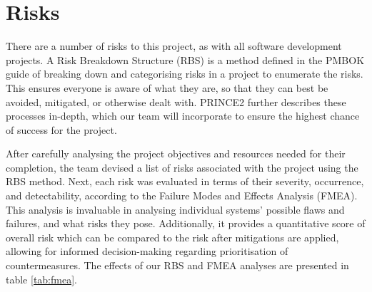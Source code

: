 \chapter{Risks}
There are a number of risks to this project, as with all software development projects. A Risk Breakdown Structure (RBS) is a method defined in the PMBOK guide \cite{pmbok2013} of breaking down and categorising risks in a project to enumerate the risks. This ensures everyone is aware of what they are, so that they can best be avoided, mitigated, or otherwise dealt with. PRINCE2 \cite{prince2} further describes these processes in-depth, which our team will incorporate to ensure the highest chance of success for the project.



After carefully analysing the project objectives and resources needed for their completion, the team devised a list of risks associated with the project using the RBS method. Next, each risk was evaluated in terms of their severity, occurrence, and detectability, according to the Failure Modes and Effects Analysis (FMEA). This analysis is invaluable in analysing individual systems' possible flaws and failures, and what risks they pose. Additionally, it provides a quantitative score of overall risk which can be compared to the risk after mitigations are applied, allowing for informed decision-making regarding prioritisation of countermeasures. The effects of our RBS and FMEA analyses are presented in table \ref{tab:fmea}.

